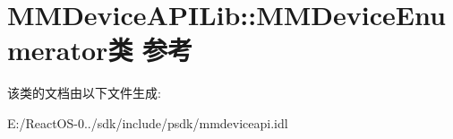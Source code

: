 \hypertarget{class_m_m_device_a_p_i_lib_1_1_m_m_device_enumerator}{}\section{M\+M\+Device\+A\+P\+I\+Lib\+:\+:M\+M\+Device\+Enumerator类 参考}
\label{class_m_m_device_a_p_i_lib_1_1_m_m_device_enumerator}


该类的文档由以下文件生成\+:\begin{DoxyCompactItemize}
\item 
E\+:/\+React\+O\+S-\/0../sdk/include/psdk/mmdeviceapi.\+idl\end{DoxyCompactItemize}
